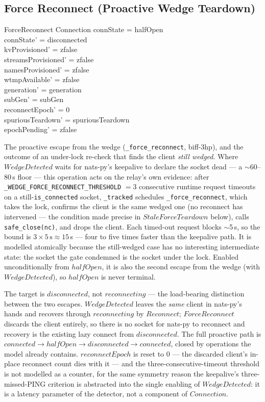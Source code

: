 \documentclass[a4paper,10pt,fleqn]{article}
\begin{document}
\subsection{Force Reconnect (Proactive Wedge Teardown)}

\begin{schema}{ForceReconnect}
  \Delta Connection
  \where
  connState = halfOpen \\
  connState' = disconnected \\
  kvProvisioned' = zfalse \\
  streamsProvisioned' = zfalse \\
  namesProvisioned' = zfalse \\
  wtmpAvailable' = zfalse \\
  generation' = generation \\
  subGen' = subGen \\
  reconnectEpoch' = 0 \\
  spuriousTeardown' = spuriousTeardown \\
  epochPending' = zfalse
\end{schema}

The proactive escape from the wedge (\texttt{\_force\_reconnect},
biff-3hp), and the outcome of an under-lock re-check that finds the
client \emph{still wedged}.  Where $WedgeDetected$ waits for nats-py's
keepalive to declare the socket dead --- a $\sim$60--80\,s floor ---
this operation acts on the relay's own evidence: after
\texttt{\_WEDGE\_FORCE\_RECONNECT\_THRESHOLD} $= 3$ consecutive runtime
request timeouts on a still-\texttt{is\_connected} socket,
\texttt{\_tracked} schedules \texttt{\_force\_reconnect}, which takes the
lock, confirms the client is the same wedged one (no reconnect has
intervened --- the condition made precise in $StaleForceTeardown$
below), calls \texttt{safe\_close(nc)}, and drops the client.  Each
timed-out request blocks $\sim$5\,s, so the bound is $3 \times
5\,\mathrm{s} \approx 15\,$s --- four to five times faster than the
keepalive path.  It is modelled atomically because the still-wedged case
has no interesting intermediate state: the socket the gate condemned is
the socket under the lock.  Enabled unconditionally from $halfOpen$, it
is also the second escape from the wedge (with $WedgeDetected$), so
$halfOpen$ is never terminal.

The target is $disconnected$, not $reconnecting$ --- the load-bearing
distinction between the two escapes.  $WedgeDetected$ leaves the
\emph{same} client in nats-py's hands and recovers through
$reconnecting$ by $Reconnect$; $ForceReconnect$ discards the client
entirely, so there is no socket for nats-py to reconnect and recovery is
the existing lazy connect from $disconnected$.  The full proactive path
is $connected \to halfOpen \to disconnected \to connected$, closed by
operations the model already contains.  $reconnectEpoch$ is reset to $0$
--- the discarded client's in-place reconnect count dies with it --- and
the three-consecutive-timeout threshold is not modelled as a counter,
for the same symmetry reason the keepalive's three-missed-PING criterion
is abstracted into the single enabling of $WedgeDetected$: it is a
latency parameter of the detector, not a component of $Connection$.
\end{document}

